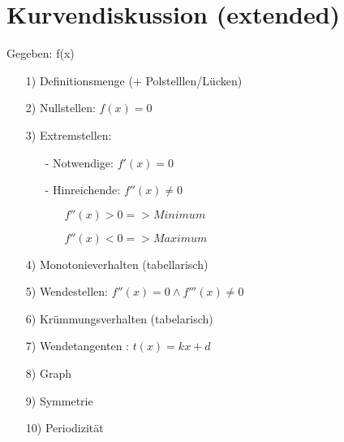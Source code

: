 \documentclass[.../mainfile.tex]{subfiles}
\begin{document}
	
	\section{Kurvendiskussion (extended)}	
	
	Gegeben: f(x)
	\begin{itemize}
		\item[1)] Definitionsmenge (+ Polstelllen/Lücken)
		\item[2)] Nullstellen: $f(x)=0$
		\item[3)] Extremstellen:
		\begin{itemize}
			\item[-] Notwendige: $f'(x)=0$
			\item[-] Hinreichende: $f''(x)\neq0$
			\begin{itemize}
				\item[] $f''(x)>0 => Minimum$
				\item[] $f''(x)<0 => Maximum$
			\end{itemize}
		\end{itemize}
		\item[4)] Monotonieverhalten (tabellarisch)
		\item[5)] Wendestellen: $f''(x)=0 \wedge  f'''(x)\neq0$
		\item[6)] Krümmungsverhalten (tabelarisch)
		\item[7)] Wendetangenten : $t(x)=kx+d$
		\item[8)] Graph
		\item[9)] Symmetrie
		\item[10)] Periodizität
	\end{itemize}
\end{document}

